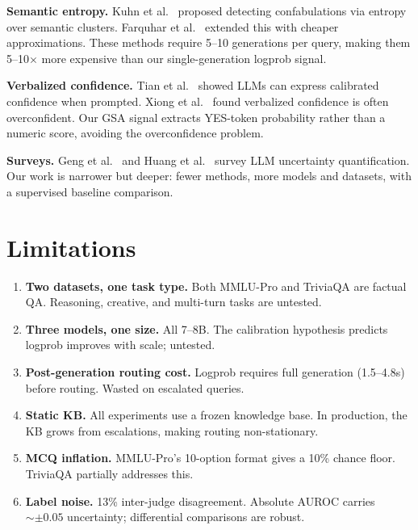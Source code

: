 \documentclass[journal]{IEEEtran}
\begin{document}
\textbf{Semantic entropy.} Kuhn et al.~\cite{kuhn2023semantic} proposed detecting confabulations via entropy over semantic clusters. Farquhar et al.~\cite{farquhar2024robust} extended this with cheaper approximations. These methods require 5--10 generations per query, making them 5--10$\times$ more expensive than our single-generation logprob signal.

\textbf{Verbalized confidence.} Tian et al.~\cite{tian2023just} showed LLMs can express calibrated confidence when prompted. Xiong et al.~\cite{xiong2024llmsexpress} found verbalized confidence is often overconfident. Our GSA signal extracts YES-token probability rather than a numeric score, avoiding the overconfidence problem.

\textbf{Surveys.} Geng et al.~\cite{geng2024survey} and Huang et al.~\cite{huang2025uncertainty} survey LLM uncertainty quantification. Our work is narrower but deeper: fewer methods, more models and datasets, with a supervised baseline comparison.

\section{Limitations}
\label{sec:limitations}

\begin{enumerate}
\item \textbf{Two datasets, one task type.} Both MMLU-Pro and TriviaQA are factual QA. Reasoning, creative, and multi-turn tasks are untested.
\item \textbf{Three models, one size.} All 7--8B. The calibration hypothesis predicts logprob improves with scale; untested.
\item \textbf{Post-generation routing cost.} Logprob requires full generation (1.5--4.8s) before routing. Wasted on escalated queries.
\item \textbf{Static KB.} All experiments use a frozen knowledge base. In production, the KB grows from escalations, making routing non-stationary.
\item \textbf{MCQ inflation.} MMLU-Pro's 10-option format gives a 10\% chance floor. TriviaQA partially addresses this.
\item \textbf{Label noise.} 13\% inter-judge disagreement. Absolute AUROC carries ${\sim}{\pm}0.05$ uncertainty; differential comparisons are robust.
\end{enumerate}

\end{document}
